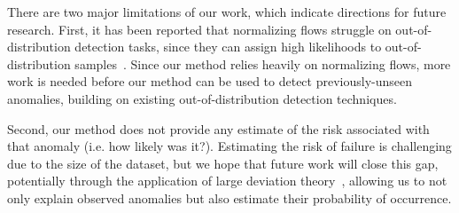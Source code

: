 There are two major limitations of our work, which indicate directions for future research. First, it has been reported that normalizing flows struggle on out-of-distribution detection tasks, since they can assign high likelihoods to out-of-distribution samples~\cite{kirichenkoWhyNormalizingFlows2020}. Since our method relies heavily on normalizing flows, more work is needed before our method can be used to detect previously-unseen anomalies, building on existing out-of-distribution detection techniques.

Second, our method does not provide any estimate of the risk associated with that anomaly (i.e. how likely was it?). Estimating the risk of failure is challenging due to the size of the dataset, but we hope that future work will close this gap, potentially through the application of large deviation theory~\cite{demboLargeDeviationsTechniques2010}, allowing us to not only explain observed anomalies but also estimate their probability of occurrence.